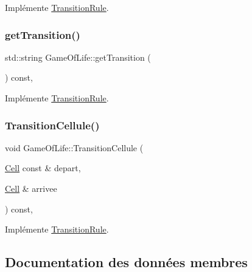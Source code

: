 Implémente \mbox{\hyperlink{class_transition_rule_ad5bbcc6ef292bb079d8980f00d011a90}{Transition\+Rule}}.

\mbox{\label{class_game_of_life_a636421a27cb52e9f7ec161d141809919}} 
\subsubsection{\texorpdfstring{get\+Transition()}{getTransition()}}
{\footnotesize\ttfamily std\+::string Game\+Of\+Life\+::get\+Transition (\begin{DoxyParamCaption}{ }\end{DoxyParamCaption}) const\hspace{0.3cm}{\ttfamily [override]}, {\ttfamily [virtual]}}



Implémente \mbox{\hyperlink{class_transition_rule_af537bee6cca486c754ee94855242328c}{Transition\+Rule}}.

\mbox{\label{class_game_of_life_a12e6db1719e64adc023e1a7d2976d38d}} 
\subsubsection{\texorpdfstring{Transition\+Cellule()}{TransitionCellule()}}
{\footnotesize\ttfamily void Game\+Of\+Life\+::\+Transition\+Cellule (\begin{DoxyParamCaption}\item[{\mbox{\hyperlink{class_cell}{Cell}} const \&}]{depart,  }\item[{\mbox{\hyperlink{class_cell}{Cell}} \&}]{arrivee }\end{DoxyParamCaption}) const\hspace{0.3cm}{\ttfamily [override]}, {\ttfamily [virtual]}}



Implémente \mbox{\hyperlink{class_transition_rule_a2b82a75ef494adc91b28755d55666e7a}{Transition\+Rule}}.



\subsection{Documentation des données membres}
\mbox{\label{class_game_of_life_ad10ffab0e8d12ccac18ec5d4bd587fcc}} 
